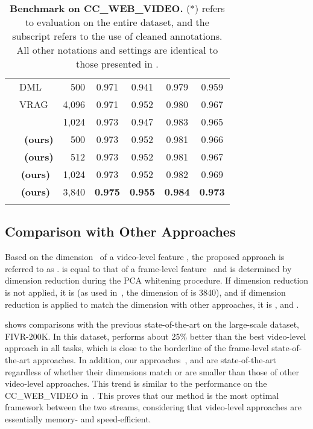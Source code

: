 \documentclass[10pt,twocolumn,letterpaper]{article}
\begin{document}
\begin{table}[t]
\begin{center}
\begin{tabular}{clrcccc}
             & DML~\cite{kordopatis2017near}  & \multicolumn{1}{r}{500} & 0.971 & 0.941 & 0.979 & 0.959 \\ 
             & VRAG~\cite{ng2022vrag}  & \multicolumn{1}{r}{4,096} & 0.971 & 0.952 & 0.980 & 0.967 \\
             & ~\cite{shao2021temporal} & 1,024 & 0.973 & 0.947 & 0.983 & 0.965 \\ \cmidrule(l){2-7} 
             & \,\,\,\textbf{(ours)}  & 500  & 0.973 & 0.952 & 0.981 & 0.966 \\
             & \,\,\,\textbf{(ours)}  & 512  & 0.973 & 0.952 & 0.981 & 0.967 \\
             & \,\textbf{(ours)}  & 1,024 & 0.973 & 0.952 & 0.982 & 0.969 \\
             & \,\textbf{(ours)}  & 3,840 & \textbf{0.975} & \textbf{0.955} & \textbf{0.984} & \textbf{0.973} \\
            \cmidrule[\heavyrulewidth]{1-7}
            \morecmidrules
            \cmidrule[\heavyrulewidth]{1-7} 
        \end{tabular} \vspace{-4mm}
        \caption{\textbf{Benchmark on CC\_WEB\_VIDEO.} (*) refers to evaluation on the entire dataset, and the subscript  refers to the use of cleaned annotations. All other notations and settings are identical to those presented in . \vspace{-6mm}} \label{tab:ccweb}
        \end{center}     
    \end{table} 
    
     
    
    
    \subsection{Comparison with Other Approaches}

        Based on the dimension~ of a video-level feature , the proposed approach is referred to as .  is equal to that of a frame-level feature~ and is determined by dimension reduction during the PCA whitening procedure. If dimension reduction is not applied, it is  (as used in~\cite{kordopatis2019visil}, the dimension of  is 3840), and if dimension reduction is applied to match the dimension with other approaches, it is ,  and .
        
        
         shows comparisons with the previous state-of-the-art on the large-scale dataset, FIVR-200K. In this dataset,  performs about 25\% better than the best video-level approach in all tasks, which is close to the borderline of the frame-level state-of-the-art approaches. In addition, our approaches~,  and  are state-of-the-art regardless of whether their dimensions match or are smaller than those of other video-level approaches. This trend is similar to the performance on the CC\_WEB\_VIDEO in~. This proves that our method is the most optimal framework between the two streams, considering that video-level approaches are essentially memory- and speed-efficient.
        
\end{document}
